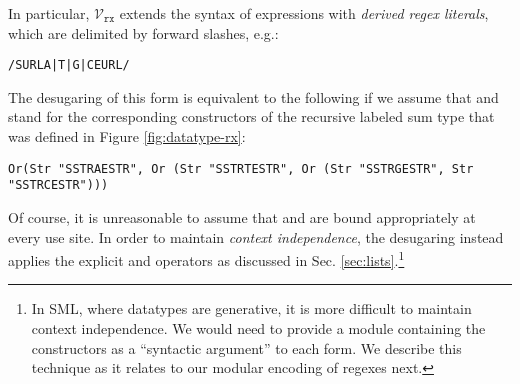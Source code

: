 In particular, $\mathcal{V}_\texttt{rx}$ extends the syntax of expressions with  \emph{derived regex literals}, which are delimited by forward slashes, e.g.:
\begin{lstlisting}[numbers=none]
/SURLA|T|G|CEURL/
\end{lstlisting}
The desugaring of this form is equivalent to the following if we assume that  and  stand for the corresponding constructors of the recursive labeled sum type  that was defined in Figure \ref{fig:datatype-rx}:
\begin{lstlisting}[numbers=none]
Or(Str "SSTRAESTR", Or (Str "SSTRTESTR", Or (Str "SSTRGESTR", Str "SSTRCESTR")))
\end{lstlisting}
Of course, it is unreasonable to assume that  and  are bound appropriately at every use site. In order to maintain \emph{context independence}, the desugaring instead applies the explicit  and  operators as discussed in Sec. \ref{sec:lists}.\footnote{In SML, where datatypes are generative, it is more difficult to maintain context independence. We would need to provide a module containing the constructors as a ``syntactic argument'' to each form. We describe this technique as it relates to our modular encoding of regexes next.}



